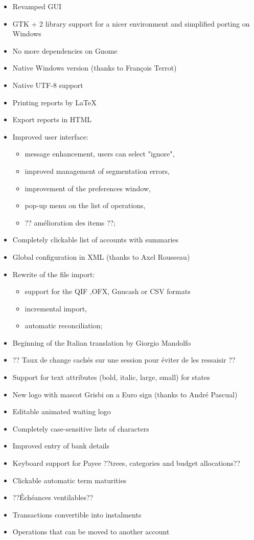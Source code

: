 \begin{itemize}%
	\item Revamped GUI
	\item GTK + 2 library support for a nicer environment and simplified porting on Windows
	\item No more dependencies on Gnome
	\item Native Windows version (thanks to François Terrot)
	\item Native \gls{UTF-8} support 
	\item Printing reports by \gls{LaTeX}
	\item Export reports in \gls{HTML}
	\item Improved user interface:
\begin{itemize}%
	\item message enhancement, users can select "ignore",
	\item improved management of segmentation errors,
	\item improvement of the preferences window,
	\item pop-up menu on the list of operations,
	\item ?? amélioration des items ??;
\end{itemize}
	\item Completely clickable list of accounts with summaries
	\item Global configuration in \gls{XML} (thanks to Axel Rousseau)
	\item Rewrite of the file import:
\begin{itemize}%
	\item support for the \gls{QIF} ,\gls{OFX}, \gls{Gnucash} or \gls{CSV}  formats
	\item incremental import,
	\item automatic reconciliation;
\end{itemize}
	\item Beginning of the Italian translation by Giorgio Mandolfo
	\item ?? Taux de change cachés sur une session pour éviter de les ressaisir ??
	\item Support for text attributes (bold, italic, large, small) for states
	\item New logo with mascot Grisbi on a Euro sign (thanks to André Pascual)
	\item Editable animated waiting logo
	\item Completely case-sensitive lists of characters
	\item Improved entry of bank details
	\item Keyboard support for Payee ??trees, categories and budget allocations??
	\item Clickable automatic term maturities
	\item ??Échéances ventilables??
	\item Transactions convertible into instalments
	\item Operations that can be moved to another account
\end{itemize}

